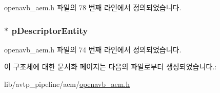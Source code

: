 openavb\+\_\+aem.\+h 파일의 78 번째 라인에서 정의되었습니다.

\subsubsection[{\texorpdfstring{p\+Descriptor\+Entity}{pDescriptorEntity}}]{$\ast$ p\+Descriptor\+Entity}\hypertarget{structopenavb__avdecc__entity__model__t_a268a49d820d3f18d5c6476073fc6c521}{}\label{structopenavb__avdecc__entity__model__t_a268a49d820d3f18d5c6476073fc6c521}


openavb\+\_\+aem.\+h 파일의 74 번째 라인에서 정의되었습니다.



이 구조체에 대한 문서화 페이지는 다음의 파일로부터 생성되었습니다.\+:\begin{DoxyCompactItemize}
\item 
lib/avtp\+\_\+pipeline/aem/\hyperlink{openavb__aem_8h}{openavb\+\_\+aem.\+h}\end{DoxyCompactItemize}

